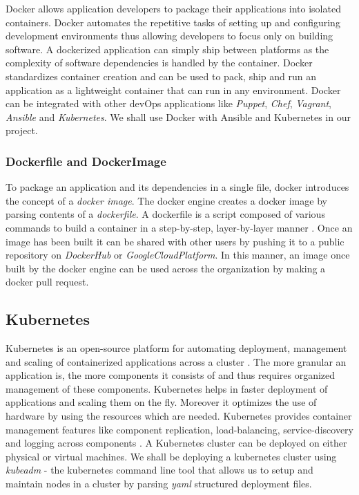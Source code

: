 \documentclass[9pt,twocolumn,twoside]{../../styles/osajnl}
\begin{document}
{\noindent
Docker allows application developers to package their applications
into isolated containers. Docker automates the repetitive tasks of
setting up and configuring development environments thus allowing
developers to focus only on building software. A dockerized
application can simply ship between platforms as the complexity of
software dependencies is handled by the container. Docker standardizes
container creation and can be used to pack, ship and run an
application as a lightweight container that can run in any
environment. Docker can be integrated with other devOps applications
like \emph{Puppet}, \emph{Chef}, \emph{Vagrant}, \emph{Ansible} and
\emph{Kubernetes}. We shall use Docker with Ansible and Kubernetes in
our project.

\subsubsection{Dockerfile and DockerImage}
To package an application and its dependencies in a single file,
docker introduces the concept of a \emph{docker image}. The docker
engine creates a docker image by parsing contents of a
\emph{dockerfile}. A dockerfile is a script composed of various
commands to build a container in a step-by-step, layer-by-layer manner
\cite{www-docker-digitalocean}. Once an image has been built it can be
shared with other users by pushing it to a public repository on
\emph{DockerHub} or \emph{GoogleCloudPlatform}. In this manner, an
image once built by the docker engine can be used across the
organization by making a docker pull request.

\subsection{Kubernetes}
Kubernetes is an open-source platform for automating deployment,
management and scaling of containerized applications across a cluster
\cite{www-wiki-kubernetes}. The more granular an application is, the
more components it consists of and thus requires organized management
of these components. Kubernetes helps in faster deployment of
applications and scaling them on the fly. Moreover it optimizes the
use of hardware by using the resources which are needed. Kubernetes
provides container management features like component replication,
load-balancing, service-discovery and logging across components
\cite{www-kubernetes-architecture}. A Kubernetes cluster can be
deployed on either physical or virtual machines. We shall be deploying
a kubernetes cluster using \emph{kubeadm} - the kubernetes command
line tool that allows us to setup and maintain nodes in a cluster by
parsing \emph{yaml} structured deployment files.

}
\end{document}
